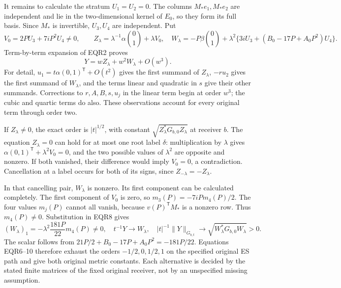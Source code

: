 \documentclass[11pt]{article}
\begin{document}
It remains to calculate the stratum $U_1=U_2=0$. The columns
$M_*e_1,M_*e_2$ are independent and lie in the two-dimensional
kernel of $E_0$, so they form its full basis. Since $M_*$ is
invertible, $U_3,U_4$ are independent. Put
\[
 V_0=2PU_3+7iP^2U_4\ne0,\qquad
 Z_\lambda=\lambda^{-1}\alpha\binom01+\lambda V_0,
 \quad
 W_\lambda=-P\beta\binom01+
 \lambda^2\{3iU_3+(B_0-17P+A_0P^2)U_4\}.
 \tag{EQR8}
\]
Term-by-term expansion of EQR2 proves
\[
 Y=wZ_\lambda+w^2W_\lambda+O(w^3).
 \tag{EQR9}
\]
For detail, $u_1=t\alpha(0,1)^{\mathsf T}+O(t^2)$ gives the
first summand of $Z_\lambda$, $-ru_2$ gives the first summand of
$W_\lambda$, and the terms linear and quadratic in $s$ give their
other summands. Corrections to $r,A,B,s,u_j$ in the linear term
begin at order $w^3$; the cubic and quartic terms do also. These
observations account for every original term through order two.

If $Z_\lambda\ne0$, the exact order is $|t|^{1/2}$, with constant
$\sqrt{Z_\lambda^*G_{b,0}Z_\lambda}$ at receiver $b$.
The equation $Z_\lambda=0$ can hold for at most one root label
$\delta$: multiplication by $\lambda$ gives
$\alpha(0,1)^{\mathsf T}+\lambda^2V_0=0$, and the two possible
values of $\lambda^2$ are opposite and nonzero. If both vanished,
their difference would imply $V_0=0$, a contradiction. Cancellation
at a label occurs for both of its signs, since $Z_{-\lambda}=-Z_\lambda$.

In that cancelling pair, $W_\lambda$ is nonzero. Its first component
can be calculated completely. The first component of $V_0$ is zero,
so $m_3(P)=-7iP m_4(P)/2$. The four values $m_j(P)$ cannot all vanish,
because $v(P)^{\mathsf T}M_*$ is a nonzero row. Thus $m_4(P)\ne0$.
Substitution in EQR8 gives
\[
 (W_\lambda)_1=-\lambda^2\frac{181P}{22}m_4(P)\ne0,
 \quad
 t^{-1}Y\longrightarrow W_\lambda,\quad
 |t|^{-1}\|Y\|_{G_{b,t}}
       \longrightarrow\sqrt{W_\lambda^*G_{b,0}W_\lambda}>0.
 \tag{EQR10}
\]
The scalar follows from $21P/2+B_0-17P+A_0P^2=-181P/22$.
Equations EQR6--10 therefore exhaust the orders
$-1/2,0,1/2,1$ on the specified original ES path and give both
original metric constants. Each alternative is decided by the stated
finite matrices of the fixed original receiver, not by an unspecified
missing assumption.
\end{document}
